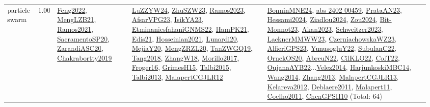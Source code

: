 {\begin{longtable}{p{3cm}r>{\raggedright\arraybackslash}p{6cm}>{\raggedright\arraybackslash}p{6cm}>{\raggedright\arraybackslash}p{8cm}}
\index{particle swarm}\index{Algorithms!particle swarm}particle swarm &  1.00 & \hyperref[detail:Feng2022]{Feng2022}, \hyperref[detail:MengLZB21]{MengLZB21}, \hyperref[detail:Ramos2021]{Ramos2021}, \hyperref[detail:SacramentoSP20]{SacramentoSP20}, \hyperref[detail:ZarandiASC20]{ZarandiASC20}, \hyperref[detail:Chakrabortty2019]{Chakrabortty2019} & \hyperref[detail:LuZZYW24]{LuZZYW24}, \hyperref[detail:ZhuSZW23]{ZhuSZW23}, \hyperref[detail:Ramos2023]{Ramos2023}, \hyperref[detail:AfsarVPG23]{AfsarVPG23}, \hyperref[detail:IsikYA23]{IsikYA23}, \hyperref[detail:EtminaniesfahaniGNMS22]{EtminaniesfahaniGNMS22}, \hyperref[detail:HamPK21]{HamPK21}, \hyperref[detail:Edis21]{Edis21}, \hyperref[detail:Hosseinian2021]{Hosseinian2021}, \hyperref[detail:Lunardi20]{Lunardi20}, \hyperref[detail:MejiaY20]{MejiaY20}, \hyperref[detail:MengZRZL20]{MengZRZL20}, \hyperref[detail:TanZWGQ19]{TanZWGQ19}, \hyperref[detail:Tang2018]{Tang2018}, \hyperref[detail:ZhangW18]{ZhangW18}, \hyperref[detail:Morillo2017]{Morillo2017}, \hyperref[detail:Froger16]{Froger16}, \hyperref[detail:GrimesH15]{GrimesH15}, \hyperref[detail:Talbi2015]{Talbi2015}, \hyperref[detail:Talbi2013]{Talbi2013}, \hyperref[detail:MalapertCGJLR12]{MalapertCGJLR12} & \hyperref[detail:BonninMNE24]{BonninMNE24}, \hyperref[detail:abs-2402-00459]{abs-2402-00459}, \hyperref[detail:PrataAN23]{PrataAN23}, \hyperref[detail:Hessami2024]{Hessami2024}, \hyperref[detail:Ziadlou2024]{Ziadlou2024}, \hyperref[detail:Zou2024]{Zou2024}, \hyperref[detail:Bit-Monnot23]{Bit-Monnot23}, \hyperref[detail:Akan2023]{Akan2023}, \hyperref[detail:Schweitzer2023]{Schweitzer2023}, \hyperref[detail:LacknerMMWW23]{LacknerMMWW23}, \hyperref[detail:CzerniachowskaWZ23]{CzerniachowskaWZ23}, \hyperref[detail:AlfieriGPS23]{AlfieriGPS23}, \hyperref[detail:YunusogluY22]{YunusogluY22}, \hyperref[detail:SubulanC22]{SubulanC22}, \hyperref[detail:OrnekOS20]{OrnekOS20}, \hyperref[detail:AbreuN22]{AbreuN22}, \hyperref[detail:CilKLO22]{CilKLO22}, \hyperref[detail:ColT22]{ColT22}, \hyperref[detail:OujanaAYB22]{OujanaAYB22}...\hyperref[detail:Velez2014]{Velez2014}, \hyperref[detail:HarjunkoskiMBC14]{HarjunkoskiMBC14}, \hyperref[detail:Wang2014]{Wang2014}, \hyperref[detail:Zhang2013]{Zhang2013}, \hyperref[detail:MalapertCGJLR13]{MalapertCGJLR13}, \hyperref[detail:Kelareva2012]{Kelareva2012}, \hyperref[detail:Deblaere2011]{Deblaere2011}, \hyperref[detail:Malapert11]{Malapert11}, \hyperref[detail:Coelho2011]{Coelho2011}, \hyperref[detail:ChenGPSH10]{ChenGPSH10} (Total: 64)\\

\end{longtable}}
